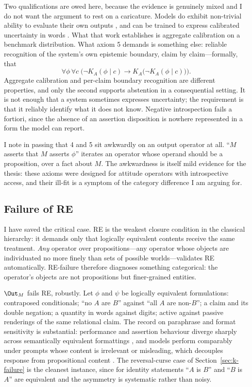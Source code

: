 Two qualifications are owed here, because the evidence is genuinely mixed and I
do not want the argument to rest on a caricature. Models do exhibit non-trivial
ability to evaluate their own outputs \citep{kadavath2022}, and can be trained
to express calibrated uncertainty in words \citep{lin2022}. What that work
establishes is aggregate calibration on a benchmark distribution. What axiom 5
demands is something else: reliable recognition of the system's own epistemic
boundary, claim by claim---formally, that
\[
  \forall \phi\, \forall c \;\bigl(\neg K_A(\phi \mid c) \rightarrow
  K_A\bigl(\neg K_A(\phi \mid c)\bigr)\bigr).
\]
Aggregate calibration and per-claim boundary recognition are different
properties, and only the second supports abstention in a consequential setting.
It is not enough that a system sometimes expresses uncertainty; the requirement
is that it reliably identify what it does not know. Negative introspection fails
a fortiori, since the absence of an assertion disposition is nowhere represented
in a form the model can report.

I note in passing that 4 and 5 sit awkwardly on an output operator at all.
``$M$ asserts that $M$ asserts $\phi$'' iterates an operator whose operand
should be a proposition, over a fact about $M$. The awkwardness is itself mild
evidence for the thesis: these axioms were designed for attitude operators with
introspective access, and their ill-fit is a symptom of the category difference
I am arguing for.

\subsection{Failure of RE}
\label{sec:re-failure}

I have saved the critical case. RE is the weakest closure condition in the
classical hierarchy: it demands only that logically equivalent contents receive
the same treatment. \emph{Any} operator over propositions---any operator whose
objects are individuated no more finely than sets of possible worlds---validates
RE automatically. RE-failure therefore diagnoses something categorical: the
operator's objects are not propositions but finer-grained entities.

$\Out_M$ fails RE, robustly. Let $\phi$ and $\psi$ be logically equivalent
formulations: contraposed conditionals; ``no $A$ are $B$'' against ``all $A$ are
non-$B$''; a claim and its double negation; a quantity in words against digits;
active against passive renderings of the same relational claim. The record on
paraphrase and format sensitivity is substantial: performance and assertion
behaviour diverge sharply across semantically equivalent formattings
\citep{sclar2024}, and models perform comparably under prompts whose content is
irrelevant or misleading, which decouples response from propositional content
\citep{webson2022}. The reversal-curse case of Section~\ref{sec:k-failure} is
the cleanest instance, since for identity statements ``$A$ is $B$'' and ``$B$ is
$A$'' are equivalent and the asymmetry is systematic rather than noisy.


